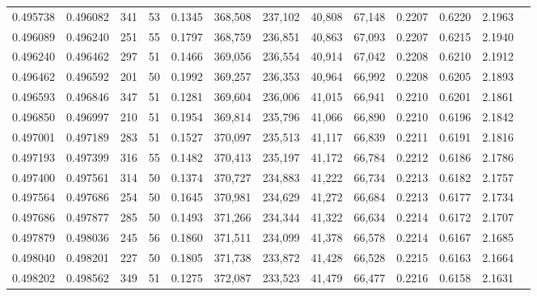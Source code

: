 \begin{tabular}{rrrrrrrrrrrrr}
0.495738 & 0.496082 &   341 &  53 &                                     0.1345 & 368,508 & 237,102 &  40,808 &  67,148 & 0.2207 & 0.6220 & 2.1963 \\
0.496089 & 0.496240 &   251 &  55 &                                     0.1797 & 368,759 & 236,851 &  40,863 &  67,093 & 0.2207 & 0.6215 & 2.1940 \\
0.496240 & 0.496462 &   297 &  51 &                                     0.1466 & 369,056 & 236,554 &  40,914 &  67,042 & 0.2208 & 0.6210 & 2.1912 \\
0.496462 & 0.496592 &   201 &  50 &                                     0.1992 & 369,257 & 236,353 &  40,964 &  66,992 & 0.2208 & 0.6205 & 2.1893 \\
0.496593 & 0.496846 &   347 &  51 &                                     0.1281 & 369,604 & 236,006 &  41,015 &  66,941 & 0.2210 & 0.6201 & 2.1861 \\
0.496850 & 0.496997 &   210 &  51 &                                     0.1954 & 369,814 & 235,796 &  41,066 &  66,890 & 0.2210 & 0.6196 & 2.1842 \\
0.497001 & 0.497189 &   283 &  51 &                                     0.1527 & 370,097 & 235,513 &  41,117 &  66,839 & 0.2211 & 0.6191 & 2.1816 \\
0.497193 & 0.497399 &   316 &  55 &                                     0.1482 & 370,413 & 235,197 &  41,172 &  66,784 & 0.2212 & 0.6186 & 2.1786 \\
0.497400 & 0.497561 &   314 &  50 &                                     0.1374 & 370,727 & 234,883 &  41,222 &  66,734 & 0.2213 & 0.6182 & 2.1757 \\
0.497564 & 0.497686 &   254 &  50 &                                     0.1645 & 370,981 & 234,629 &  41,272 &  66,684 & 0.2213 & 0.6177 & 2.1734 \\
0.497686 & 0.497877 &   285 &  50 &                                     0.1493 & 371,266 & 234,344 &  41,322 &  66,634 & 0.2214 & 0.6172 & 2.1707 \\
0.497879 & 0.498036 &   245 &  56 &                                     0.1860 & 371,511 & 234,099 &  41,378 &  66,578 & 0.2214 & 0.6167 & 2.1685 \\
0.498040 & 0.498201 &   227 &  50 &                                     0.1805 & 371,738 & 233,872 &  41,428 &  66,528 & 0.2215 & 0.6163 & 2.1664 \\
0.498202 & 0.498562 &   349 &  51 &                                     0.1275 & 372,087 & 233,523 &  41,479 &  66,477 & 0.2216 & 0.6158 & 2.1631 \\

\end{tabular}
